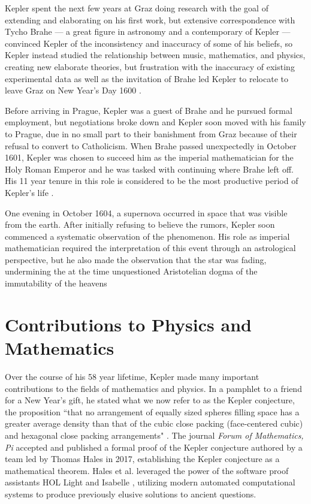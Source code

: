 \documentclass[11pt]{article}
\begin{document}
Kepler spent the next few years at Graz
doing research with the goal of extending
and elaborating on his first work,
but extensive correspondence with Tycho Brahe
--- a great figure in astronomy and a contemporary of Kepler ---
convinced Kepler
of the inconsistency and inaccuracy
of some of his beliefs, 
so Kepler instead studied the relationship between
music, mathematics, and physics,
creating new elaborate theories,
but frustration with
the inaccuracy of existing experimental data
as well as the invitation of Brahe
led Kepler to relocate to leave Graz
on New Year's Day 1600 \cite{caspar}.

Before arriving in Prague,
Kepler was a guest of Brahe
and he pursued formal employment,
but negotiations broke down
and Kepler soon moved
with his family to Prague,
due in no small part to their
banishment from Graz
because of their refusal
to convert to Catholicism.
When Brahe passed unexpectedly in October 1601,
Kepler was chosen to succeed him
as the imperial mathematician
for the Holy Roman Emperor
and he was tasked with
continuing where Brahe left off.
His 11 year tenure in this role
is considered to be the
most productive period of Kepler's life \cite{caspar}.

One evening in October 1604,
a supernova occurred in space
that was visible from the earth.
After initially refusing to believe the rumors,
Kepler soon commenced a systematic
observation of the phenomenon.
His role as imperial mathematician
required the interpretation of this
event through an astrological perspective,
but he also made the observation
that the star was fading,
undermining the at the time unquestioned
Aristotelian dogma of the immutability of the heavens \cite{caspar}


\section{Contributions to Physics and Mathematics}

Over the course of his 58 year lifetime,
Kepler made many important contributions
to the fields of mathematics and physics.
In a pamphlet to a friend for a New Year's gift,
he stated what we now refer to as the Kepler conjecture,
the proposition
``that no arrangement of equally sized spheres
filling space has a greater average density than
that of the cubic close packing (face-centered cubic)
and hexagonal close packing arrangements" \cite{conjecture}.
The journal \textit{Forum of Mathematics, Pi}
accepted and published a formal proof
of the Kepler conjecture
authored by a team led by Thomas Hales in 2017,
establishing the Kepler conjecture
as a mathematical theorem.
Hales et al. leveraged the power of
the software proof assistants HOL Light and Isabelle \cite{hales},
utilizing modern automated computational systems
to produce previously elusive solutions to ancient questions.
\end{document}
